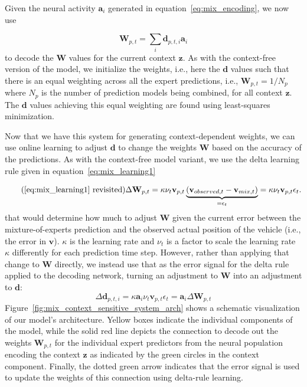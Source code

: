Given the neural activity $\mathbf{a}_i$ generated in equation~\eqref{eq:mix_encoding}, we now use 

\begin{equation}
  \mathbf{W}_{p,t} = \sum_{i} \mathbf{d}_{p,t,i}\mathbf{a}_i
  \label{eq:mix_decoding}
\end{equation}
to decode the $\mathbf{W}$ values for the current context $\mathbf{z}$. 
As with the context-free version of the model, we initialize the weights, i.e., here the $\mathbf{d}$ values such that there is an equal weighting across all the expert predictions, i.e., $\mathbf{W}_{p,t} = 1/N_p$ where $N_p$ is the number of prediction models being combined, for all context $\mathbf{z}$.
The $\mathbf{d}$ values achieving this equal weighting are found using least-squares minimization.

Now that we have this system for generating context-dependent weights, we can use online learning to adjust $\mathbf{d}$ to change the weights $\mathbf{W}$ based on the accuracy of the predictions. 
As with the context-free model variant, we use the delta learning rule given in equation~\eqref{eq:mix_learning1}  

\begin{equation}
    \tag{\eqref{eq:mix_learning1} revisited}
    \Delta\mathbf{W}_{p,t} = \kappa \nu_{t} \mathbf{v}_{p,t} \underbrace{(\mathbf{v}_{observed,t}-\mathbf{v}_{mix,t})}_{=\epsilon_t} = \kappa \nu_{t} \mathbf{v}_{p,t} \epsilon_t.
\end{equation}
that would determine how much to adjust $\mathbf{W}$ given the current error between the mixture-of-experts prediction and the observed actual position of the vehicle (i.e., the error in $\mathbf{v}$).  
$\kappa$ is the learning rate and $\nu_{t}$ is a factor to scale the learning rate $\kappa$ differently for each prediction time step.
However, rather than applying that change to $\mathbf{W}$ directly, we instead use that as the error signal for the delta rule applied to the decoding network, turning an adjustment to $\mathbf{W}$ into an adjustment to $\mathbf{d}$:
\begin{equation}
\Delta\mathbf{d}_{p,t,i} = \kappa \mathbf{a}_i \nu_{t} \mathbf{v}_{p,t} \epsilon_t = \mathbf{a}_i \Delta\mathbf{W}_{p,t}
  \label{eq:learning2}
\end{equation}
Figure~\ref{fig:mix_context_sensitive_system_arch} shows a schematic visualization of our model's architecture.
Yellow boxes indicate the individual components of the model, while the solid red line depicts the connection to decode out the weights $ \mathbf{W}_{p,t}$ for the individual expert predictors from the neural population encoding the context $\mathbf{z}$ as indicated by the green circles in the context component.
Finally, the dotted green arrow indicates that the error signal is used to update the weights of this connection using delta-rule learning.

